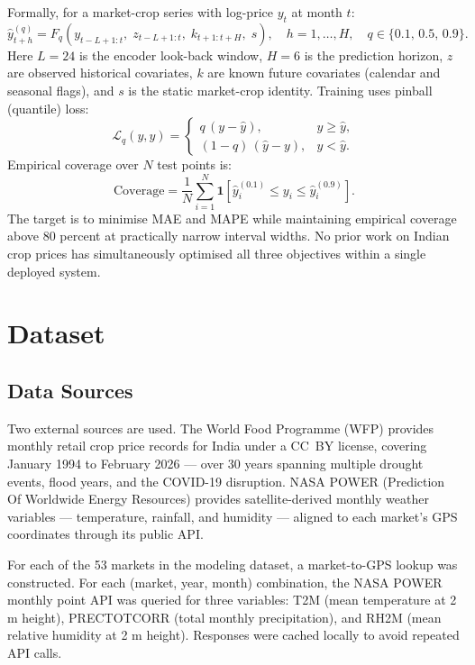 \documentclass[12pt,a4paper]{report}
\begin{document}
Formally, for a market-crop series with log-price $y_t$ at month $t$:
\[
\hat{y}_{t+h}^{(q)} = F_q\!\left(y_{t-L+1:t},\; z_{t-L+1:t},\; k_{t+1:t+H},\; s\right),
\quad h=1,\ldots,H,\quad q \in \{0.1,\,0.5,\,0.9\}.
\]
Here $L=24$ is the encoder look-back window, $H=6$ is the prediction horizon, $z$ are
observed historical covariates, $k$ are known future covariates (calendar and seasonal flags),
and $s$ is the static market-crop identity. Training uses pinball (quantile) loss:
\[
\mathcal{L}_q(y,\hat{y})=
\begin{cases}
q\,(y-\hat{y}), & y \ge \hat{y}, \\[2pt]
(1-q)\,(\hat{y}-y), & y < \hat{y}.
\end{cases}
\]
Empirical coverage over $N$ test points is:
\[
\text{Coverage}=\frac{1}{N}\sum_{i=1}^{N}\mathbf{1}\!\left[\hat{y}_{i}^{(0.1)}\le y_i \le \hat{y}_{i}^{(0.9)}\right].
\]
The target is to minimise MAE and MAPE while maintaining empirical coverage above 80 percent
at practically narrow interval widths. No prior work on Indian crop prices has simultaneously
optimised all three objectives within a single deployed system.

\chapter{Dataset}

\section{Data Sources}

Two external sources are used. The World Food Programme (WFP) provides monthly retail crop
price records for India under a CC~BY license, covering January 1994 to February 2026 ---
over 30 years spanning multiple drought events, flood years, and the COVID-19 disruption.
NASA POWER (Prediction Of Worldwide Energy Resources) provides satellite-derived monthly
weather variables --- temperature, rainfall, and humidity --- aligned to each market's GPS
coordinates through its public API.

For each of the 53 markets in the modeling dataset, a market-to-GPS lookup was constructed.
For each (market, year, month) combination, the NASA POWER monthly point API was queried
for three variables: T2M (mean temperature at 2 m height), PRECTOTCORR (total monthly
precipitation), and RH2M (mean relative humidity at 2 m height). Responses were cached
locally to avoid repeated API calls.
\end{document}
